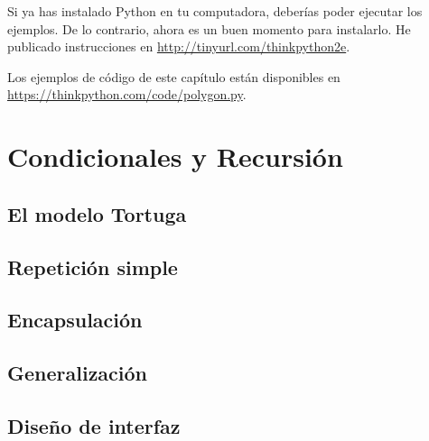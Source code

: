 \documentclass[12pt,letterpaper]{book}
\begin{document}
Si ya has instalado Python en tu computadora, deberías poder ejecutar los ejemplos. De lo contrario, ahora es un buen momento para instalarlo. He publicado instrucciones en \url{http://tinyurl.com/thinkpython2e}.

Los ejemplos de código de este capítulo están disponibles en \url{https://thinkpython.com/code/polygon.py}.


\chapter{Condicionales y Recursión}


\section{El modelo Tortuga}
\section{Repetición simple}
\section{Encapsulación}
\section{Generalización}
\section{Diseño de interfaz}

\backmatter






%
%
\end{document}
